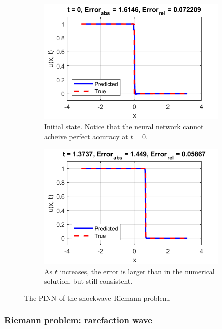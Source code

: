 \documentclass{myproject}
\begin{document}
\begin{figure}
\centering
    \begin{subfigure}{.48\textwidth}
        \centering
        \includegraphics[width=1.0\textwidth]{t0_NN_shockwave.png}
        \caption{Initial state. Notice that the neural network cannot acheive perfect accuracy at $t=0$.}
    \end{subfigure}\hfill
    \begin{subfigure}{.48\textwidth}
        \centering
        \includegraphics[width=1\textwidth]{t137_NN_shockwave.png}
        \caption{As $t$ increases, the error is larger than in the numerical solution, but still consistent.}
    \end{subfigure}
    \caption{The PINN of the shockwave Riemann problem.}
\end{figure}

\subsubsection{Riemann problem: rarefaction wave}
\end{document}
